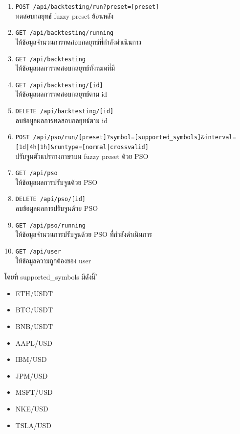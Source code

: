 \begin{enumerate}
    \item \texttt{POST {\footnotesize /api/backtesting/run?preset=[preset]}} \\ทดสอบกลยุทธ์ fuzzy preset ย้อนหลัง
    \item \texttt{GET {\footnotesize /api/backtesting/running}} \\ให้ข้อมูลจำนวนการทดสอบกลยุทธ์ที่กำลังดำเนินการ
    \item \texttt{GET {\footnotesize /api/backtesting}} \\ให้ข้อมูลผลการทดสอบกลยุทธ์ทั้งหมดที่มี
    \item \texttt{GET {\footnotesize /api/backtesting/[id]}} \\ให้ข้อมูลผลการทดสอบกลยุทธ์ตาม id
    \item \texttt{DELETE {\footnotesize /api/backtesting/[id]}} \\ลบข้อมูลผลการทดสอบกลยุทธ์ตาม id
    \item \texttt{POST {\footnotesize /api/pso/run/[preset]?symbol=[supported\_symbols]\&interval=[1d|4h|1h]\&runtype=[normal|crossvalid]}} \\ปรับจูนตัวแปรทางภาษาบน fuzzy preset ด้วย PSO
    \item \texttt{GET {\footnotesize /api/pso}} \\ให้ข้อมูลผลการปรับจูนด้วย PSO
    \item \texttt{DELETE {\footnotesize /api/pso/[id]}} \\ลบข้อมูลผลการปรับจูนด้วย PSO
    \item \texttt{GET {\footnotesize /api/pso/running}} \\ให้ข้อมูลจำนวนการปรับจูนด้วย PSO ที่กำลังดำเนินการ
    \item \texttt{GET {\footnotesize /api/user}} \\ให้ข้อมูลความถูกต้องของ user
\end{enumerate}
โดยที่ supported\_symbols มีดังนี้
ิ\begin{itemize}
    \item ETH/USDT
    \item BTC/USDT
    \item BNB/USDT
    \item AAPL/USD
    \item IBM/USD
    \item JPM/USD
    \item MSFT/USD
    \item NKE/USD
    \item TSLA/USD
\end{itemize}

